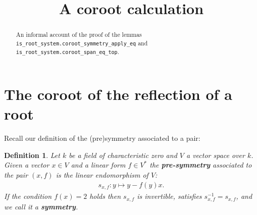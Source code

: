 \documentclass[12pt, a4paper]{article}
\title{A coroot calculation}
\newtheorem{definition}[lemma]{Definition}
\begin{document}
\maketitle

\begin{abstract}
  An informal account of the proof of the lemmas\\
  \texttt{is\_root\_system.coroot\_symmetry\_apply\_eq} and
  \texttt{is\_root\_system.coroot\_span\_eq\_top}.
\end{abstract}

\section{The coroot of the reflection of a root}

Recall our definition of the (pre)symmetry associated to a pair:
\begin{definition}
  Let $k$ be a field of characteristic zero and $V$ a vector space over $k$. Given a vector
  $x \in V$ and a linear form $f \in V^*$ the \textbf{pre-symmetry} associated to the pair $(x, f)$
  is the linear endomorphism of $V$:
  \begin{align}\label{symmetry_formula}
    s_{x,f} : y \mapsto y - f(y)x.
  \end{align}
  If the condition $f(x) = 2$
  holds then $s_{x,f}$ is invertible, satisfies $s_{x,f}^{-1} = s_{x,f}$, and we call it a
  \textbf{symmetry}.
\end{definition}
\end{document}

